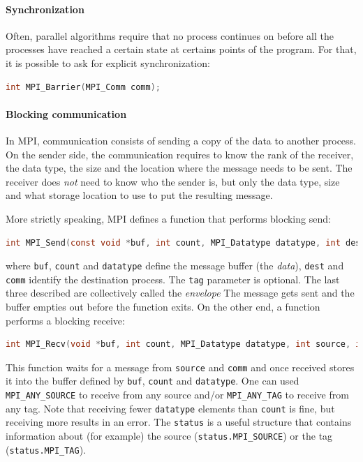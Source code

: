 \documentclass{article}
\begin{document}
\paragraph{Synchronization}
Often, parallel algorithms require that no process continues on before all the processes have reached a certain state at certains points of the program. For that, it is possible to ask for explicit synchronization:
\begin{lstlisting}[language=C]
  int MPI_Barrier(MPI_Comm comm);
\end{lstlisting}

\paragraph{Blocking communication}
In MPI, communication consists of sending a copy of the data to another process. On the sender side, the communication requires to know the rank of the receiver, the data type, the size and the location where the message needs to be sent. The receiver does \textit{not} need to know who the sender is, but only the data type, size and what storage location to use to put the resulting message.

More strictly speaking, MPI defines a function that performs blocking send:
\begin{lstlisting}[language=C]
  int MPI_Send(const void *buf, int count, MPI_Datatype datatype, int dest, int tag, MPI_Comm comm)
\end{lstlisting}
where \lstinline{buf}, \lstinline{count} and \lstinline{datatype} define the message buffer (the \textit{data}), \lstinline{dest} and \lstinline{comm} identify the destination process. The \lstinline{tag} parameter is optional. The last three described are collectively called the \textit{envelope} The message gets sent and the buffer empties out before the function exits.
On the other end, a function performs a blocking receive:
\begin{lstlisting}[language=C]
  int MPI_Recv(void *buf, int count, MPI_Datatype datatype, int source, int tag, MPI_Comm comm, MPI_Status *status)
\end{lstlisting}
This function waits for a message from \lstinline{source} and \lstinline{comm} and once received stores it into the buffer defined by \lstinline{buf}, \lstinline{count} and \lstinline{datatype}. One can used \lstinline{MPI_ANY_SOURCE} to receive from any source and/or \lstinline{MPI_ANY_TAG} to receive from any tag. Note that receiving fewer \lstinline{datatype} elements than \lstinline{count} is fine, but receiving more results in an error. The \lstinline{status} is a useful structure that contains information about (for example) the source (\lstinline{status.MPI_SOURCE}) or the tag (\lstinline{status.MPI_TAG}).
\end{document}
